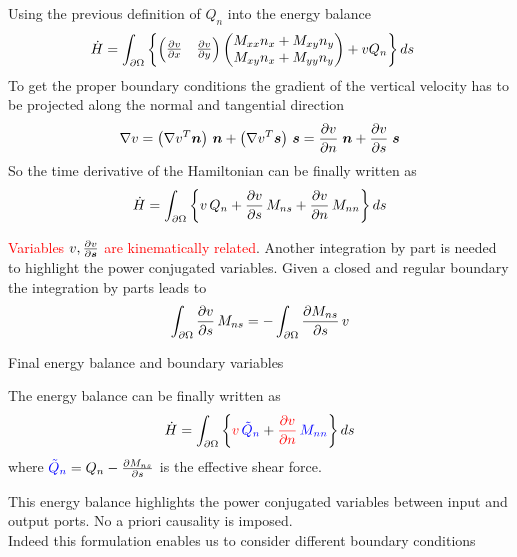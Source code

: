\documentclass{beamer}
\begin{document}
\begin{frame}
Using the previous definition of $Q_n$ into the energy balance
\begin{align*}
\dot{H} = \int_{\partial \Omega}  & \left\{ 
\begin{pmatrix}
\diffp{v}{x} & \diffp{v}{y} \\
\end{pmatrix}
\begin{pmatrix}
M_{xx} n_x + M_{xy} n_y \\
M_{xy} n_x + M_{yy} n_y \\
\end{pmatrix} 
+ v Q_n
\right\} ds
\end{align*}
To get the proper boundary conditions the gradient of the vertical velocity has to be projected along the normal and tangential direction
\begin{equation*}
\nabla v = \left(\nabla v^T \bm{n} \right) \,\bm{n} + \left(\nabla v^T \bm{s} \right) \, \bm{s} = \diffp{v}{n} \; \bm{n} +   \diffp{v}{s} \; \bm{s}
\end{equation*}
So the time derivative of the Hamiltonian can be finally written as
\begin{equation*}
\dot{H} = \int_{\partial \Omega} \left\{ v \, Q_n + \diffp{v}{s} \, M_{ns} + \diffp{v}{n} \, M_{nn}\right\} ds
\end{equation*}

\textcolor{red}{Variables $v, \diffp{v}{\bm{s}}$ are kinematically related}. Another integration by part is needed to highlight the power conjugated variables. Given a closed and regular boundary the integration by parts leads to
\begin{equation*}
\int_{\partial \Omega} \diffp{v}{s} \, M_{ns} = - \int_{\partial \Omega} \diffp{M_{ns}}{s} \, v
\end{equation*}
\end{frame}

\begin{frame}{Final energy balance and boundary variables}
\begin{tcolorbox}
 The energy balance can be finally written as
\begin{equation*}
\label{eq:energyBal_Kir}
\dot{H} = \int_{\partial \Omega} \left\{ \textcolor{red}{v} \, \textcolor{blue}{\tilde{Q}_n} + \textcolor{red}{\diffp{v}{n}} \, \textcolor{blue}{M_{nn}} \right\} ds
\end{equation*} 
where $\textcolor{blue}{\tilde{Q}_n} = Q_n - \diffp{M_{ns}}{s}$ is the effective shear force.
\end{tcolorbox}

This energy balance highlights the power conjugated variables between input and output ports. No a priori causality is imposed. \\
\vspace{5mm}
Indeed this formulation enables us to consider different boundary conditions
\end{frame}
\end{document}
